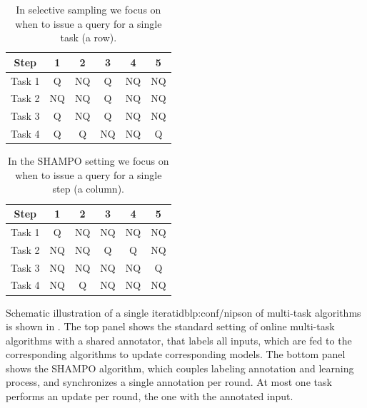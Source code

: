 \begin{table}[htdp]
\begin{center}
{
\centering
\begin{tabular}{|c c c c c c|} \hline
 Step &	1 &	2 &	3 &	4 &	5 \\  \hline
 Task 1 &	Q      &	NQ &	Q &	NQ &	NQ \\ \hline
 Task 2 &	NQ   &	NQ &	Q &	NQ &	NQ \\ \hline
 Task 3 &	Q      &	 NQ &	Q &	NQ &	NQ \\ \hline
 Task 4 &	Q      &	Q &	NQ &	NQ &	Q \\ \hline
\end{tabular}
}
\end{center}
\caption{In selective sampling we focus on when to issue a query for a single task (a row).}
\label{tab:multitask_selective_sampling_example}
\end{table}

\begin{table}[htdp]
\begin{center}
{
\centering
\begin{tabular}{|c c c c c c|} \hline
 Step &	1 &	2 &	3 &	4 &	5 \\  \hline
 Task 1 &	Q &	  NQ &	NQ &	NQ &	NQ \\ \hline
 Task 2 &	NQ &	NQ &	Q &	Q &	NQ \\ \hline
 Task 3 &	NQ &	 NQ &	NQ &	NQ &	Q \\ \hline
 Task 4 &	NQ &	Q &	NQ &	NQ &	NQ \\ \hline
\end{tabular}
}
\end{center}
\label{tab:multitask_SHAMPO_example} 
\caption{ In the SHAMPO setting we focus on when to issue a query for a single step (a column).}
\end{table}


Schematic illustration of a single iteratidblp:conf/nipson of multi-task algorithms is shown in . 
The top panel shows the standard setting of online multi-task algorithms with a shared annotator, that 
labels all inputs, which are fed to the corresponding algorithms to update corresponding models. The
bottom panel shows the SHAMPO algorithm, which couples labeling
annotation and learning process, and synchronizes a single annotation
per round.  At most one task performs an update per round, the one
with the annotated input.

